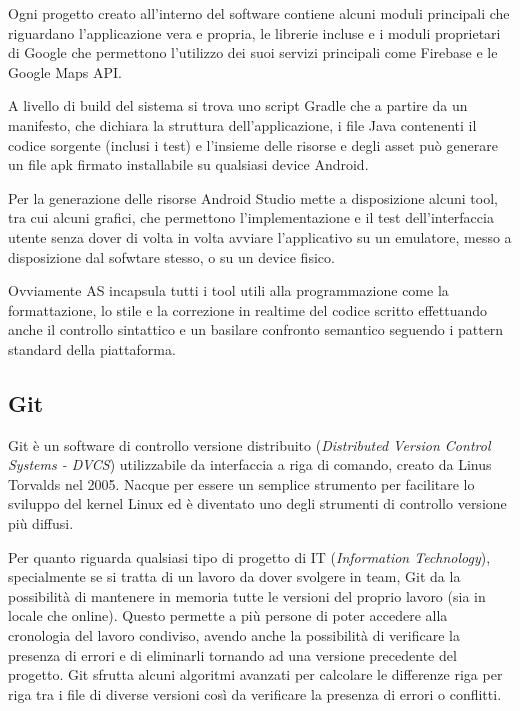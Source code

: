 Ogni progetto creato all'interno del software contiene alcuni moduli
principali che riguardano l'applicazione vera e propria, le librerie
incluse e i moduli proprietari di Google che permettono l'utilizzo
dei suoi servizi principali come Firebase e le Google Maps API.

A livello di build del sistema si trova uno script Gradle che a partire
da un manifesto, che dichiara la struttura dell'applicazione, i file
Java contenenti il codice sorgente (inclusi i test) e l'insieme delle
risorse e degli asset può generare un file apk firmato installabile
su qualsiasi device Android.

Per la generazione delle risorse Android Studio mette a disposizione
alcuni tool, tra cui alcuni grafici, che permettono l'implementazione
e il test dell'interfaccia utente senza dover di volta in volta avviare
l'applicativo su un emulatore, messo a disposizione dal sofwtare stesso,
o su un device fisico.

Ovviamente AS incapsula tutti i tool utili alla programmazione come
la formattazione, lo stile e la correzione in realtime del codice
scritto effettuando anche il controllo sintattico e un basilare confronto
semantico seguendo i pattern standard della piattaforma.

\subsection{Git}

Git è un software di controllo versione distribuito (\textit{Distributed
Version Control Systems - DVCS}) utilizzabile da interfaccia a riga
di comando, creato da Linus Torvalds nel 2005. \autocite{WIKIPEDIA:GIT}
Nacque per essere un semplice strumento per facilitare lo sviluppo
del kernel Linux ed è diventato uno degli strumenti di controllo versione
più diffusi.

Per quanto riguarda qualsiasi tipo di progetto di IT (\textit{Information
Technology}), specialmente se si tratta di un lavoro da dover svolgere
in team, Git da la possibilità di mantenere in memoria tutte le versioni
del proprio lavoro (sia in locale che online). Questo permette a più
persone di poter accedere alla cronologia del lavoro condiviso, avendo
anche la possibilità di verificare la presenza di errori e di eliminarli
tornando ad una versione precedente del progetto. Git sfrutta alcuni
algoritmi avanzati per calcolare le differenze riga per riga tra i
file di diverse versioni così da verificare la presenza di errori
o conflitti.

